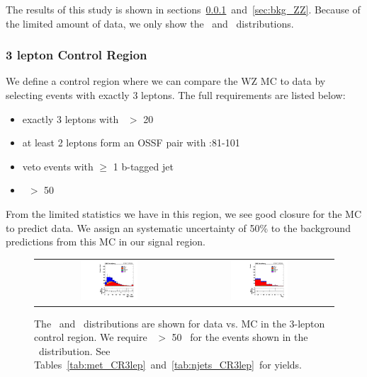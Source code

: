 The results of this study is shown in sections~\ref{sec:bkg_WZ}~and~\ref{sec:bkg_ZZ}.
Because of the limited amount of data, we only show the \MET\ and \nj\ distributions.

\subsubsection{3 lepton Control Region}
\label{sec:bkg_WZ}

We define a control region where we can compare the WZ MC to data by selecting events with exactly 3 leptons.
The full requirements are listed below:

\begin{itemize}
\item exactly 3 leptons with \pt\ $>$ 20 \gev
\item at least 2 leptons form an OSSF pair with \mll:81-101 \gev
\item veto events with $\geq$ 1 b-tagged jet
\item \MET\ $>$ 50 \gev 
\end{itemize}

From the limited statistics we have in this region, we see good closure for the MC to predict data.
We assign an systematic uncertainty of 50\% to the background predictions from this MC in our signal region.

\begin{figure}[!htb]
\begin{center}
\begin{tabular}{cc}
\includegraphics[width=0.4\textwidth]{bkgd/figs/h_metall_ll_signalregion_CR3lep_passtrig.pdf} &
\includegraphics[width=0.4\textwidth]{bkgd/figs/h_njtm50_ll_signalregion_CR3lep_passtrig.pdf} \\
\end{tabular}
\caption{The \MET\ and \nj\ distributions are shown for data vs. MC in the 3-lepton control region.
  We require \MET\ $>$ 50 \gev\ for the events shown in the \nj\ distribution.
See Tables~\ref{tab:met_CR3lep}~and~\ref{tab:njets_CR3lep}~for yields.
\label{fig:bkg_CR3lep}
}
\end{center}
\end{figure}



